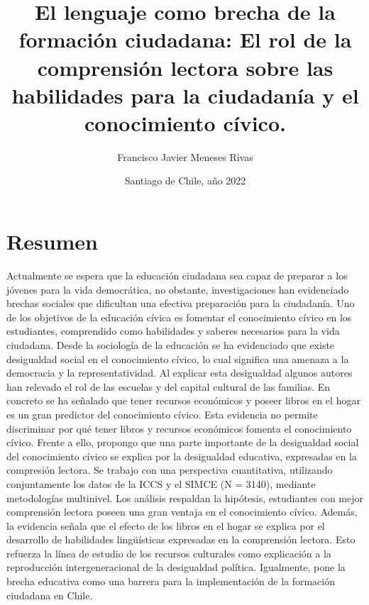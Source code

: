 \documentclass[12pt,twoside]{templates/facsothesis}
\title{{ El lenguaje como brecha de la formación ciudadana: } El rol de la comprensión lectora sobre las habilidades para la ciudadanía y el conocimiento cívico.}
\author{Francisco Javier Meneses Rivas}
\date{Santiago de Chile, año 2022}
\begin{document}

  \maketitle

\frontmatter %
\pagestyle{empty} %



  \setcounter{tocdepth}{1}
  \setlength{\parskip}{0pt}
  \tableofcontents

\setlength\parskip{1em plus 0.1em minus 0.2em}

  \listoftables

  \listoffigures



\mainmatter %
\pagestyle{fancyplain} %

\hypertarget{resumen}{%
\chapter*{Resumen}\label{resumen}}

Actualmente se espera que la educación ciudadana sea capaz de preparar a los jóvenes para la vida democrática, no obstante, investigaciones han evidenciado brechas sociales que dificultan una efectiva preparación para la ciudadanía. Uno de los objetivos de la educación cívica es fomentar el conocimiento cívico en los estudiantes, comprendido como habilidades y saberes necesarios para la vida ciudadana. Desde la sociología de la educación se ha evidenciado que existe desigualdad social en el conocimiento cívico, lo cual significa una amenaza a la democracia y la representatividad. Al explicar esta desigualdad algunos autores han relevado el rol de las escuelas y del capital cultural de las familias. En concreto se ha señalado que tener recursos económicos y poseer libros en el hogar es un gran predictor del conocimiento cívico. Esta evidencia no permite discriminar por qué tener libros y recursos económicos fomenta el conocimiento cívico. Frente a ello, propongo que una parte importante de la desigualdad social del conocimiento cívico se explica por la desigualdad educativa, expresadas en la compresión lectora. Se trabajo con una perspectiva cuantitativa, utilizando conjuntamente los datos de la ICCS y el SIMCE (N = 3140), mediante metodologías multinivel. Los análisis respaldan la hipótesis, estudiantes con mejor comprensión lectora poseen una gran ventaja en el conocimiento cívico. Además, la evidencia señala que el efecto de los libros en el hogar se explica por el desarrollo de habilidades lingüísticas expresadas en la comprensión lectora. Esto refuerza la línea de estudio de los recursos culturales como explicación a la reproducción intergeneracional de la desigualdad política. Igualmente, pone la brecha educativa como una barrera para la implementación de la formación ciudadana en Chile.
\end{document}
